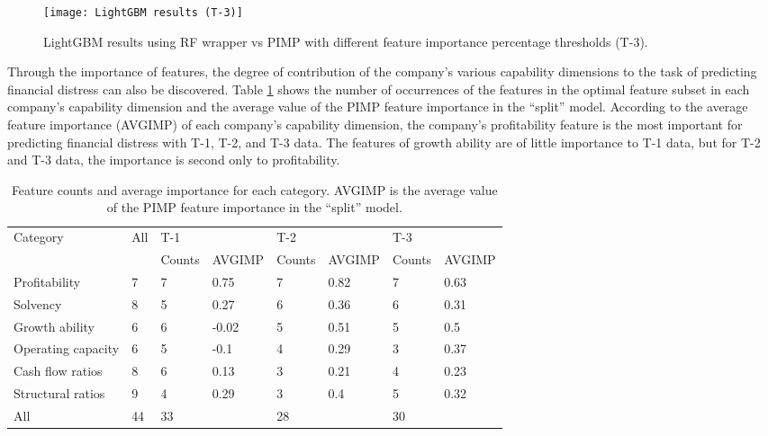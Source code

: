 \documentclass[review]{elsarticle}
\begin{document}
\begin{figure}[H]
    \centering
    \texttt{[image: LightGBM results (T-3)]}
    \caption{LightGBM results using RF wrapper vs PIMP with different feature importance percentage thresholds (T-3).}
    \label{fig: RF wrapper vs PIMP 3}
\end{figure}

Through the importance of features, the degree of contribution of the company's various capability dimensions to the task of predicting financial distress can also be discovered. Table \ref{table: company ability} shows the number of occurrences of the features in the optimal feature subset in each company's capability dimension and the average value of the PIMP feature importance in the ``split'' model. According to the average feature importance (AVGIMP) of each company's capability dimension, the company's profitability feature is the most important for predicting financial distress with T-1, T-2, and T-3 data. The features of growth ability are of little importance to T-1 data, but for T-2 and T-3 data, the importance is second only to profitability.

\begin{table}[H]\footnotesize
    \centering
    \caption{Feature counts and average importance for each category. AVGIMP is the average value of the PIMP feature importance in the ``split'' model.}
    \label{table: company ability}
    \begin{tabular}{llllllll}
    \hline
    \multirow{2}{*}{Category} & \multirow{2}{*}{All} & \multicolumn{2}{l}{T-1} & \multicolumn{2}{l}{T-2} & \multicolumn{2}{l}{T-3} \\ \cline{3-8}
     &  & Counts & AVGIMP & Counts & AVGIMP& Counts & AVGIMP \\ \hline
    Profitability & 7 & 7 & 0.75 & 7 & 0.82 & 7 & 0.63 \\
    Solvency & 8 & 5 & 0.27 & 6 & 0.36 & 6 & 0.31 \\
    Growth ability & 6 & 6 & -0.02 & 5 & 0.51 & 5 & 0.5 \\
    Operating capacity & 6 & 5 & -0.1 & 4 & 0.29 & 3 & 0.37 \\
    Cash flow ratios & 8 & 6 & 0.13 & 3 & 0.21 & 4 & 0.23 \\
    Structural ratios & 9 & 4 & 0.29 & 3 & 0.4 & 5 & 0.32 \\
    All & 44 & 33 &  & 28 &  & 30 &  \\ \hline
    \end{tabular}
    \end{table}
\end{document}
